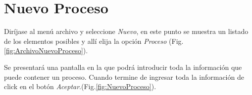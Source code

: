 \section{Nuevo Proceso}
\label{sec:nuevoProceso}
Dir\'ijase al men\'u archivo y seleccione \emph{Nuevo}, en este punto se muestra un listado de los elementos posibles y
all\'i elija la opci\'on \emph{Proceso} (Fig.\ref{fig:ArchivoNuevoProceso}). 
  

Se presentar\'a una pantalla en la que podr\'a introducir toda la informaci\'on
que puede contener un proceso. Cuando termine de ingresar toda la informaci\'on de click en el bot\'on \emph{Aceptar}.(Fig.\ref{fig:NuevoProceso}). 
  

